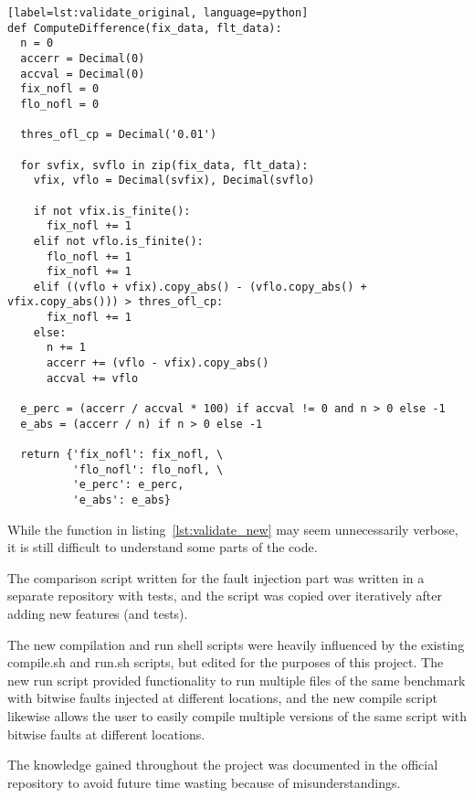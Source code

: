 \begin{verbatim}[label=lst:validate_original, language=python]
def ComputeDifference(fix_data, flt_data):
  n = 0
  accerr = Decimal(0)
  accval = Decimal(0)
  fix_nofl = 0
  flo_nofl = 0

  thres_ofl_cp = Decimal('0.01')

  for svfix, svflo in zip(fix_data, flt_data):
    vfix, vflo = Decimal(svfix), Decimal(svflo)

    if not vfix.is_finite():
      fix_nofl += 1
    elif not vflo.is_finite():
      flo_nofl += 1
      fix_nofl += 1
    elif ((vflo + vfix).copy_abs() - (vflo.copy_abs() + vfix.copy_abs())) > thres_ofl_cp:
      fix_nofl += 1
    else:
      n += 1
      accerr += (vflo - vfix).copy_abs()
      accval += vflo
      
  e_perc = (accerr / accval * 100) if accval != 0 and n > 0 else -1
  e_abs = (accerr / n) if n > 0 else -1
      
  return {'fix_nofl': fix_nofl, \
          'flo_nofl': flo_nofl, \
          'e_perc': e_perc,
          'e_abs': e_abs}
\end{verbatim}



While the function in listing~\ref{lst:validate_new} may seem unnecessarily verbose, it is still difficult to understand some parts of the code.

The comparison script written for the fault injection part was written in a separate repository with tests, and the script was copied over iteratively after adding new features (and tests).

The new compilation and run shell scripts were heavily influenced by the existing compile.sh and run.sh scripts, but edited for the purposes of this project. The new run script provided functionality to run multiple files of the same benchmark with bitwise faults injected at different locations, and the new compile script likewise allows the user to easily compile multiple versions of the same script with bitwise faults at different locations.


The knowledge gained throughout the project was documented in the official \taffo repository to avoid future time wasting because of misunderstandings. 